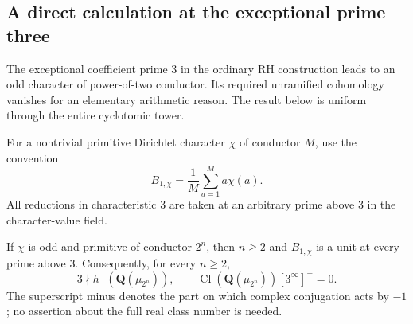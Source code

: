 \subsection{A direct calculation at the exceptional prime three}
\label{sec:rh-dyadic-bernoulli-unit}

The exceptional coefficient prime $3$ in the ordinary RH construction
leads to an odd character of power-of-two conductor.  Its required
unramified cohomology vanishes for an elementary arithmetic reason.
The result below is uniform through the entire cyclotomic tower.

For a nontrivial primitive Dirichlet character $\chi$ of conductor $M$,
use the convention
\[
                 B_{1,\chi}=\frac1M\sum_{a=1}^{M}a\chi(a).
                                                               \tag{DB1}
\]
All reductions in characteristic $3$ are taken at an arbitrary prime
above $3$ in the character-value field.

\begin{theorem}
\label{thm:dyadic-bernoulli-three-unit}
If $\chi$ is odd and primitive of conductor $2^n$, then $n\ge2$
and $B_{1,\chi}$ is a unit at every prime above $3$.
Consequently, for every $n\ge2$,
\[
       3\nmid h^-(\mathbf Q(\mu_{2^n})),\qquad
       \operatorname{Cl}(\mathbf Q(\mu_{2^n}))[3^\infty]^- =0.
                                                               \tag{DB2}
\]
The superscript minus denotes the part on which complex conjugation
acts by $-1$; no assertion about the full real class number is needed.
\end{theorem}

